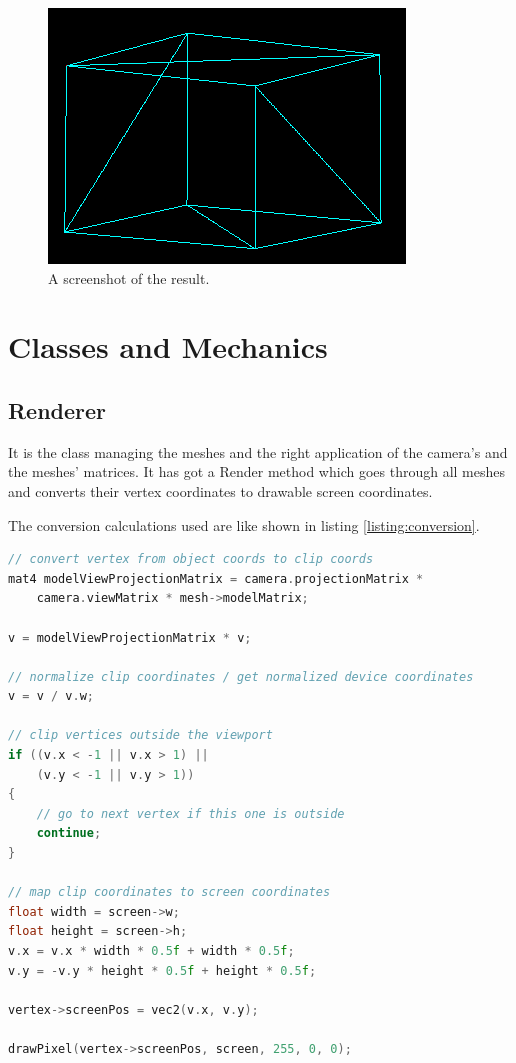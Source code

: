 \documentclass[12pt]{article}
\begin{document}
\begin{figure}[H]
	\includegraphics[width=\textwidth]{screenshot.png}
	\caption{A screenshot of the result.}
	\label{figure:outcome}
\end{figure}

\section{Classes and Mechanics}
\label{section:classes}

\subsection{Renderer} 

It is the class managing the meshes and the right application of the camera's and the meshes' matrices. It has got a Render method which goes through all meshes and converts their vertex coordinates to drawable screen coordinates.

The conversion calculations used are like shown in listing \ref{listing:conversion}.

\begin{lstlisting}[caption=The conversion from object coordinates to screen coordinates.,label=listing:conversion,language=C++]
// convert vertex from object coords to clip coords
mat4 modelViewProjectionMatrix = camera.projectionMatrix * 
	camera.viewMatrix * mesh->modelMatrix;

v = modelViewProjectionMatrix * v;

// normalize clip coordinates / get normalized device coordinates
v = v / v.w;

// clip vertices outside the viewport
if ((v.x < -1 || v.x > 1) ||
	(v.y < -1 || v.y > 1))
{
	// go to next vertex if this one is outside
	continue;
}

// map clip coordinates to screen coordinates
float width = screen->w;
float height = screen->h;
v.x = v.x * width * 0.5f + width * 0.5f;
v.y = -v.y * height * 0.5f + height * 0.5f;

vertex->screenPos = vec2(v.x, v.y);

drawPixel(vertex->screenPos, screen, 255, 0, 0);
\end{lstlisting}
\end{document}
